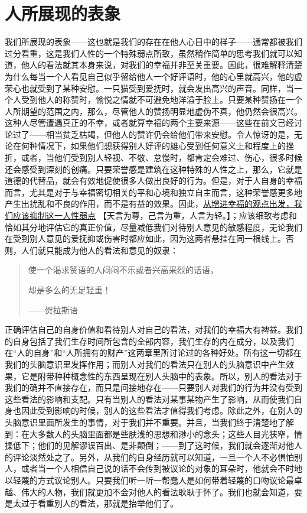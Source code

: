 \documentclass[12pt,oneside]{book}
\begin{document}
 

\chapter{人所展现的表象 }
我们所展现的表象——这也就是我们的存在在他人心目中的样子——通常都被我们过分看重，这是我们人性的一个特殊弱点所致，虽然稍作简单的思考我们就可以知道，他人的看法就其本身来说，对我们的幸福并非至关重要。因此，很难解释清楚为什么每当一个人看见自己似乎留给他人一个好评语时，他的心里就高兴，他的虚荣心也就受到了某种安慰。一只猫受到爱抚时，就会发出高兴的声音。同样，当一个人受到他人的称赞时，愉悦之情就不可避免地洋溢于脸上。只要某种赞扬在一个人所期望的范围之内，那么，尽管他人的赞扬明显地虚伪不真，他仍然会很高兴。这种人尽管遭遇真正的不幸，或者就算幸福的两个主要来源——这些在前文已经讨论过了——相当贫乏枯竭，但他人的赞许仍会给他们带来安慰。令人惊讶的是，无论在何种情况下，如果他们想获得别人好评的雄心受到任何意义上和程度上的挫折，或者，当他们受到别人轻视、不敬、怠慢时，都肯定会难过、伤心，很多时候还会感受到深刻的创痛。只要荣誉感是建筑在这种特殊的人性之上，那么，它就是道德的代替品，就会有效地促使很多人做出良好的行为。但是，对于人自身的幸福而言，尤其是对于与幸福密切相关的平和心境和独立自主而言，这种荣誉感更多地产生出扰乱和不良的作用，而不是有益的效果。因此，\uline{从增进幸福的观点出发，我们应该抑制这一人性弱点} 【天言为尊，己言为重，人言为轻。】；应该细致考虑和恰如其分地评估它的真正价值，尽量减低我们对待别人意见的敏感程度，无论我们在受到别人意见的爱抚抑或伤害时都应如此，因为这两者悬挂在同一根线上。否则，人们就只能成为他人的看法和意见的奴隶： 

 
\begin{quotation}
使一个渴求赞语的人闷闷不乐或者兴高采烈的话语， 

却是多么的无足轻重！ 

——贺拉斯语 
\end{quotation}


正确评估自己的自身价值和看待别人对自己的看法，对我们的幸福大有裨益。我们的自身包括了我们生存时间所包含的全部内容，我们生存的内在成分，以及我们在“人的自身”和“人所拥有的财产”这两章里所讨论过的各种好处。所有这一切都在我们的头脑意识里发挥作用；而别人对我们的看法只在别人的头脑意识中产生效果，它是附带种种概念性的东西呈现在别人头脑中的表象。所以，别人的看法对于我们的确并不直接存在，而只是间接地存在——只要别人对我们的行为并没有受到这些看法的影响和支配。只有当别人的看法对某事某物产生了影响，从而使我们自身也因此受到影响的时候，别人的这些看法才值得我们考虑。除此之外，在别人的头脑意识里面所发生的事情，对于我们并不重要。并且，当我们终于清楚地了解到：在大多数人的头脑里面都是些肤浅的思想和渺小的念头；这些人目光狭窄，情操低下；他们的见解谬误百出、是非颠倒；——到了这时候，我们就会逐渐对他人的评论淡然处之了。另外，从我们的自身经历就可以知道，一旦一个人不必惧怕别人，或者当一个人相信自己说的话不会传到被议论的对象的耳朵时，他就会不时地以轻蔑的方式议论别人。只要我们听一听一帮蠢人是如何带着轻蔑的口吻议论最卓越、伟大的人物，我们就更加不会对他人的看法耿耿于怀了。我们也就会知道，要是太过于看重别人的看法，那就是抬举他们了。 
\end{document}
